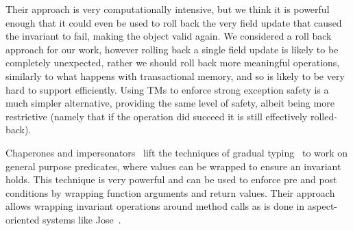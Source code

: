 Their approach is very computationally intensive, but we think it is powerful enough that it could even be used to roll back the very field update that caused the invariant to fail, making the object valid again.
We considered a roll back approach for our work, however rolling back a single field update is likely to be completely unexpected, rather we should roll back more meaningful operations, similarly to what happens
with transactional memory, and so is likely to be very hard to support efficiently.
Using TMs to enforce strong exception safety is a much simpler alternative, providing the same level of safety, albeit being more restrictive (namely that if the operation did succeed it is still effectively rolled-back).



Chaperones and impersonators~\cite{?} lift the techniques of gradual typing~\cite{takikawa2015towards,??}
to work on general purpose predicates, where
values can be wrapped to ensure an invariant holds.
This technique is very powerful and can be used to enforce pre and post conditions by wrapping function arguments and return values.
Their approach allows wrapping invariant operations around method calls as is done in aspect-oriented systems like Jose~\cite{?}.

